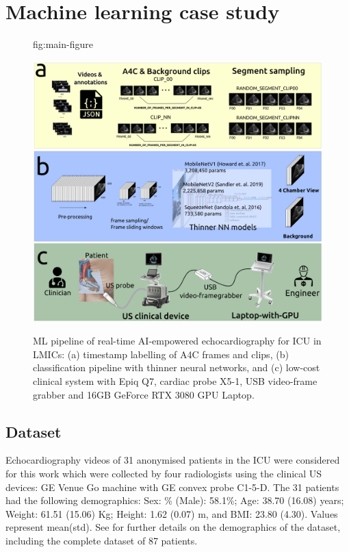 \documentclass[mlabstract,twocolumn]{jmlr}
\begin{document}
\section{Machine learning case study}
\begin{figure}[ht]%
\floatconts
  {fig:main-figure}
  {\caption{
      ML pipeline of real-time AI-empowered echocardiography for ICU in LMICs:
      (a) timestamp labelling of A4C frames and clips,
      (b) classification pipeline with thinner neural networks, and
      (c) low-cost clinical system with Epiq Q7, cardiac probe X5-1, USB video-frame grabber and 16GB GeForce RTX 3080 GPU Laptop.
    }
  }
  {\includegraphics[width=0.70\linewidth]{../figures/main-figure/versions/drawing-v03}}%
\end{figure}
\subsection{Dataset}
Echocardiography videos of 31 anonymised patients in the ICU were considered for this work which were collected by four radiologists using the clinical US devices: GE Venue Go machine with GE convex probe C1-5-D.
The 31 patients had the following demographics:
Sex: \% (Male): 58.1\%;
Age: 38.70 (16.08) years;
Weight: 61.51 (15.06) Kg;
Height: 1.62 (0.07) m, and 
BMI: 23.80 (4.30). 
Values represent mean(std).
See  for further details on the demographics of the dataset, including the complete dataset of 87 patients.
\end{document}
